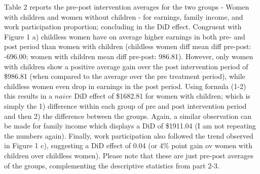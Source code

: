 \documentclass[a4paper]{article}
\begin{document}
Table 2 reports the pre-post intervention averages for the two groups - Women with children and women without children - for earnings, family income, and work participation proportion; concluding in the DiD effect. Congruent with Figure 1 a) childless women have on average higher earnings in both pre- and post period than women with children (childless women diff mean diff pre-post: -696.00; women with children mean diff pre-post: 986.81). However, only women with children show a positive average gain over the post intervention period of \$986.81 (when compared to the average over the pre treatment period), while childless women even drop in earnings in the post period. Using formula (1-2) this results in a $naive$ DiD effect of \$1682.81 for women with children; which is simply the 1) difference within each group of pre and post intervention period and then 2) the difference between the groups. Again, a similar observation can be made for family income which displays a DiD of \$1911.04 (I am not repeating the numbers again). Finally, work participation also followed the trend observed in Figure 1 c), suggesting a DiD effect of 0.04 (or 4\% point gain ov women with children over childless women). Please note that these are just pre-post averages of the groups, complementing the descriptive statistics from part 2-3.
\end{document}
